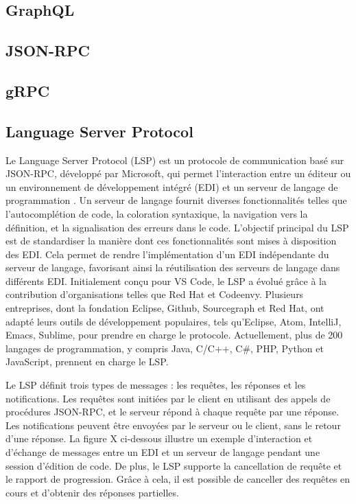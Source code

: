 \subsection{GraphQL}

\subsection{JSON-RPC}

\subsection{gRPC}

\subsection{Language Server Protocol}

Le Language Server Protocol (LSP) est un protocole de communication basé sur JSON-RPC, développé par Microsoft, qui permet l'interaction entre un éditeur ou un environnement de développement intégré (EDI) et un serveur de langage de programmation \cite{Keidel2016}. Un serveur de langage fournit diverses fonctionnalités telles que l'autocomplétion de code, la coloration syntaxique, la navigation vers la définition, et la signalisation des erreurs dans le code. L'objectif principal du LSP est de standardiser la manière dont ces fonctionnalités sont mises à disposition des EDI. Cela permet de rendre l'implémentation d'un EDI indépendante du serveur de langage, favorisant ainsi la réutilisation des serveurs de langage dans différents EDI. Initialement conçu pour VS Code, le LSP a évolué grâce à la contribution d'organisations telles que Red Hat et Codeenvy. Plusieurs entreprises, dont la fondation Eclipse, Github, Sourcegraph et Red Hat, ont adapté leurs outils de développement populaires, tels qu'Eclipse, Atom, IntelliJ, Emacs, Sublime, pour prendre en charge le protocole. Actuellement, plus de 200 langages de programmation, y compris Java, C/C++, C\#, PHP, Python et JavaScript, prennent en charge le LSP.

Le LSP définit trois types de messages : les requêtes, les réponses et les notifications. Les requêtes sont initiées par le client en utilisant des appels de procédures JSON-RPC, et le serveur répond à chaque requête par une réponse. Les notifications peuvent être envoyées par le serveur ou le client, sans le retour d'une réponse. La figure X ci-dessous illustre un exemple d'interaction et d'échange de messages entre un EDI et un serveur de langage pendant une session d'édition de code. De plus, le LSP supporte la cancellation de requête et le rapport de progression. Grâce à cela, il est possible de canceller des requêtes en cours et d'obtenir des réponses partielles.

